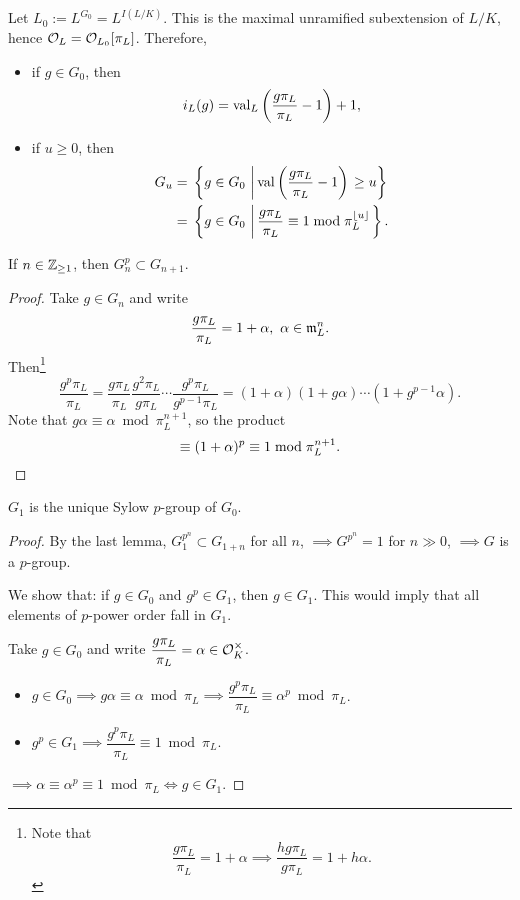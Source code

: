 Let $L_0 := L^{G_0} = L^{I(L/K)}$.
This is the maximal unramified subextension of $L/K$, hence $\mathcal{O}_L = \mathcal{O}_{L_0}[\pi_L]$.
Therefore, \begin{itemize}
    \item if $g\in G_0$,
then \[i_L(g) = \operatorname{val}_L\left( \frac{g\pi_L}{\pi_L} - 1 \right) + 1,\]
    \item if $u\ge 0$, then \begin{align*}
        G_u = {}& \left\{g\in G_0\,\left|\, \operatorname{val}\left( \frac{g\pi_L}{\pi_L} - 1 \right)\right.\ge u\right\}\\
        = {}& \left\{ g\in G_0\,\left|\,
            \frac{g\pi_L}{\pi_L}\equiv 1\bmod\pi_L^{\lfloor u\rfloor}
        \right. \right\}.
    \end{align*}
\end{itemize}
\begin{lemma}
    If $n\in\mathbb{Z}_{\ge 1}$,
    then $G_n^p\subset G_{n+1}$.
\end{lemma}
\begin{proof}
    Take $g\in G_n$ and write \[\frac{g\pi_L}{\pi_L} = 1 + \alpha,\ \alpha\in\mathfrak{m}_L^n.\]
    Then\footnote{\label{lem: gx/x = 1 + a => h(gx)/gx = 1 + ha}
    Note that 
        \[\dfrac{g\pi_L}{\pi_L} = 1 + \alpha
        \implies
        \frac{hg\pi_L}{g\pi_L} = 1 + h\alpha.\]
        }
    \[\frac{g^p\pi_L }{\pi_L} = \frac{g\pi_L }{\pi_L}\frac{g^2\pi_L}{g\pi_L}\cdots\frac{g^p\pi_L}{g^{p-1}\pi_L} = (1 + \alpha)(1 + g\alpha)\cdots(1 +g^{p-1}\alpha).\]
    Note that $g\alpha\equiv\alpha\bmod\pi_L^{n+1}$,
    so the product\[\equiv (1 + \alpha)^{p}\equiv 1\bmod\pi_L^{n+1}.\qedhere\]
\end{proof}

\begin{proposition}\label{G1 is unique Sylow-p of G0}
    $G_1$ is the unique Sylow $p$-group of $G_0$.
\end{proposition}
\begin{proof}
    By the last lemma,
    $G_1^{p^n}\subset G_{1 + n}$ for all $n$,
    $\implies G^{p^n} = 1$ for $n\gg 0$,
    $\implies G$ is a $p$-group.

    We show that: if $g\in G_0$ and $g^p\in G_1$,
    then $g\in G_1$.
    This would imply that all elements of $p$-power order fall in $G_1$.

    Take $g\in G_0$ and write $\dfrac{g\pi_L}{\pi_L} = \alpha\in\mathcal{O}_K^\times$.
    \begin{itemize}
\item $g\in G_0\implies g\alpha\equiv\alpha\bmod\pi_L\implies \dfrac{g^p\pi_L}{\pi_L}\equiv \alpha^p\bmod\pi_L$.
\item $g^p\in G_1\implies \dfrac{g^p\pi_L}{\pi_L}\equiv 1\bmod\pi_L$.
    \end{itemize}
    $\implies \alpha\equiv \alpha^p \equiv 1\bmod\pi_L\iff g\in G_1$.
\end{proof}

